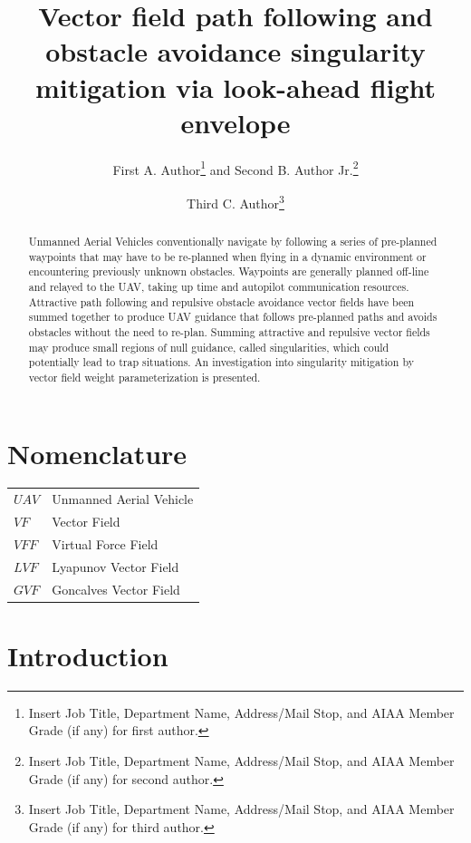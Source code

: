 \documentclass[conf]{new-aiaa}
\title{Vector field  path following and obstacle avoidance singularity mitigation via look-ahead flight envelope}
\author{First A. Author\footnote{Insert Job Title, Department Name, Address/Mail Stop, and AIAA Member Grade (if any) for first author.} and Second B. Author Jr.\footnote{Insert Job Title, Department Name, Address/Mail Stop, and AIAA Member Grade (if any) for second author.}}
\affil{Business or Academic Affiliation 1, City, State, Zip Code}
\author{Third C. Author\footnote{Insert Job Title, Department Name, Address/Mail Stop, and AIAA Member Grade (if any) for third author.}}
\begin{document}
\maketitle

\begin{abstract}



Unmanned Aerial Vehicles conventionally navigate by following a series of pre-planned waypoints that may have to be re-planned when flying in a dynamic environment or encountering previously unknown obstacles. Waypoints are generally planned off-line and relayed to the UAV, taking up time and autopilot communication resources. Attractive path following and repulsive obstacle avoidance vector fields have been summed together to produce UAV guidance that follows pre-planned paths and avoids obstacles without the need to re-plan. Summing attractive and repulsive vector fields may produce small regions of null guidance, called singularities, which could potentially lead to trap situations. An investigation into singularity mitigation by vector field weight parameterization is presented. 


\end{abstract}



\section{Nomenclature}

{\renewcommand\arraystretch{1.0}
\noindent\begin{longtable*}{@{}l @{\quad=\quad} l@{}}
$UAV$  & Unmanned Aerial Vehicle \\
$VF$   & Vector Field \\
$VFF$  & Virtual Force Field \\
$LVF$  & Lyapunov Vector Field \\
$GVF$  & Goncalves Vector Field \\
\end{longtable*}}

\section{Introduction}


%
%
%
\end{document}
